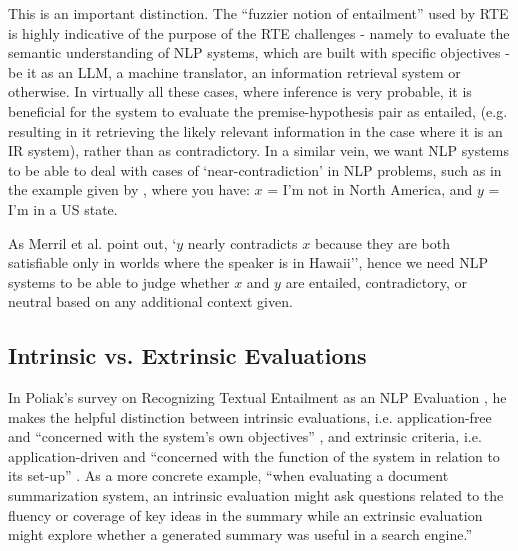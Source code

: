 \documentclass[12pt,twoside]{report}
\begin{document}
This is an important distinction. The ``fuzzier notion of entailment'' \cite{poliak-2020-survey} used by RTE is highly indicative of the purpose of the RTE challenges - namely to evaluate the semantic understanding of NLP systems, which are built with specific objectives - be it as an LLM, a machine translator, an information retrieval system or otherwise. In virtually all these cases, where inference is very probable, it is beneficial for the system to evaluate the premise-hypothesis pair as entailed, (e.g. resulting in it retrieving the likely relevant information in the case where it is an IR system), rather than as contradictory. In a similar vein, we want NLP systems to be able to deal with cases of `near-contradiction' in NLP problems, such as in the example given by \cite{merrill-etal-2022-entailment}, where you have: $x$ = I’m not in North America, and $y$ = I’m in a US state. \newline \par


As Merril et al. point out, `$y$ nearly contradicts $x$ because they are both satisfiable only in worlds where the speaker is in Hawaii'', hence we need NLP systems to be able to judge whether $x$ and $y$ are entailed, contradictory, or neutral based on any additional context given. 

\subsection{Intrinsic vs. Extrinsic Evaluations}

In Poliak's survey on Recognizing Textual Entailment as an NLP Evaluation \cite{poliak-2020-survey}, he makes the helpful distinction between intrinsic evaluations, i.e. application-free and ``concerned with the system’s own objectives'' \cite{estival1997}, and extrinsic criteria, i.e. application-driven and ``concerned with the function of the system in relation to its set-up'' \cite{estival1997}. As a more concrete example, ``when evaluating a document summarization system, an intrinsic evaluation might ask questions related to the fluency or coverage of key ideas in the summary while an extrinsic evaluation might explore whether a generated summary was useful in a search engine.'' \cite{poliak-2020-survey} \newline \par
\end{document}
